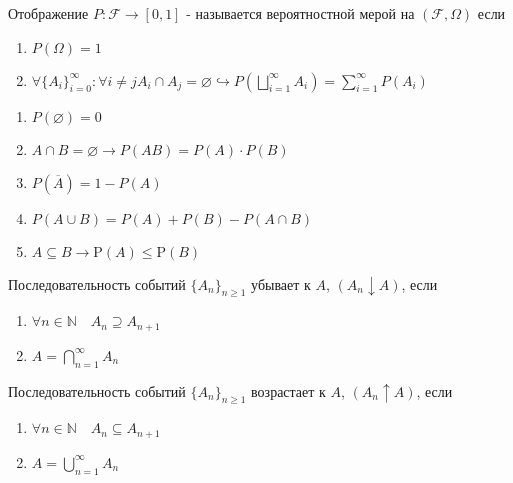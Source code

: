 \begin{definition}
	Отображение $ P:\mathcal{F} \rightarrow \left[0,1\right]$ - называется вероятностной мерой на $ (\mathcal{F}, \Omega) $ если
	\begin{enumerate}
	\item $ P(\Omega)=1 $
	\item $\displaystyle \forall  \lbrace A_i \rbrace^{\infty}_{i=0}  :
	\forall i \neq j A_{i} \cap A_{j}=\varnothing \hookrightarrow P\left(\bigsqcup_{i=1}^{\infty} A_{i}\right)=\sum_{i=1}^{\infty} P\left(A_{i}\right)
	$
	\end{enumerate}	
\end{definition}

\begin{properties}
	\begin{enumerate}
		\item $P(\varnothing)=0$
		\item $A\cap B=\varnothing \rightarrow P(AB) = P(A) \cdot P(B)$
		\item $P(\overline{A})=1-P(A)$
		\item $P(A \cup B)=P(A)+P(B)-P(A \cap B)$
		\item $A \subseteq B \rightarrow  \mathrm{P}(A) \leq \mathrm{P}(B)$
	\end{enumerate}
\end{properties}

\begin{definition}
	Последовательность событий $ \lbrace A_n \rbrace_{n \geq 1 } $ убывает к $ A $, $ (A_n\downarrow A) $, если 
	\begin{enumerate}
		\item $  \forall n \in \mathbb{N} \quad A_{n} \supseteq A_{n+1}$
		\item $\displaystyle A=\bigcap_{n=1}^{\infty} A_{n}$
	\end{enumerate}	
\end{definition}	

\begin{definition}
		Последовательность событий $ \lbrace A_n \rbrace_{n \geq 1 } $ возрастает к $ A $, $ (A_n\uparrow A) $, если 
	\begin{enumerate}
		\item $  \forall n \in \mathbb{N} \quad A_{n} \subseteq A_{n+1}$
		\item $\displaystyle A=\bigcup_{n=1}^{\infty} A_{n}$
	\end{enumerate}	
\end{definition}

